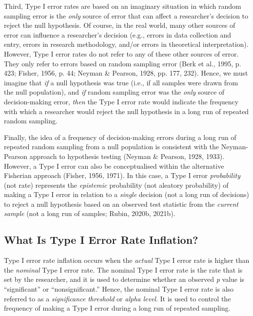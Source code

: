 \documentclass[authordate, meta]{jote-new-article}
\begin{document}
	Third, Type I error rates are based on an imaginary situation in which random sampling error is the \emph{only} source of error that can affect a researcher's decision to reject the null hypothesis. Of course, in the real world, many other sources of error can influence a researcher's decision (e.g., errors in data collection and entry, errors in research methodology, and/or errors in theoretical interpretation). However, Type I error rates do not refer to any of these other sources of error. They only refer to errors based on random sampling error (Berk et al., 1995, p. 423; Fisher, 1956, p. 44; Neyman \& Pearson, 1928, pp. 177, 232). Hence, we must imagine that \emph{if} a null hypothesis was true (i.e., if all samples were drawn from the null population), and \emph{if }random sampling error was the \emph{only} source of decision-making error, \emph{then} the Type I error rate would indicate the frequency with which a researcher would reject the null hypothesis in a long run of repeated random sampling.



	Finally, the idea of a frequency of decision-making errors during a long run of repeated random sampling from a null population is consistent with the Neyman-Pearson approach to hypothesis testing (Neyman \& Pearson, 1928, 1933). However, a Type I error can also be conceptualised within the alternative Fisherian approach (Fisher, 1956, 1971). In this case, a Type I error \emph{probability} (not rate) represents the \emph{epistemic} probability (not aleatory probability) of making a Type I error in relation to a \emph{single} decision (not a long run of decisions) to reject a null hypothesis based on an observed test statistic from the \emph{current sample} (not a long run of samples; Rubin, 2020b, 2021b).







	\subsection{What Is Type I Error Rate Inflation?}



	Type I error rate inflation occurs when the \emph{actual} Type I error rate is higher than the \emph{nominal} Type I error rate. The nominal Type I error rate is the rate that is set by the researcher, and it is used to determine whether an observed \emph{p} value is “significant” or “nonsignificant.” Hence, the nominal Type I error rate is also referred to as a \emph{significance threshold} or \emph{alpha level}. It is used to control the frequency of making a Type I error during a long run of repeated sampling.
\end{document}
